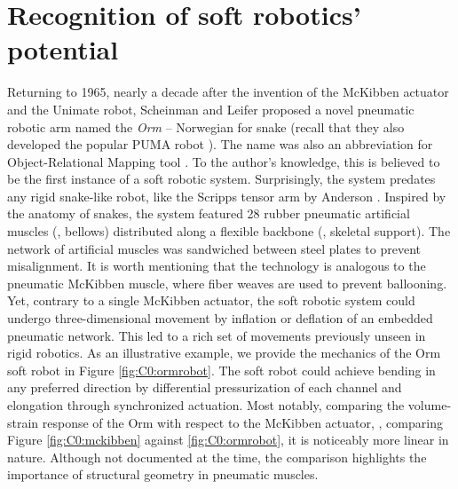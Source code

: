 \section{Recognition of soft robotics' potential} Returning to 1965, nearly a decade after the invention of the McKibben actuator and the Unimate robot, Scheinman and Leifer proposed a novel pneumatic robotic arm named the \emph{Orm} -- Norwegian for snake (recall that they also developed the popular PUMA robot \cite{BibEntryPuma2022Sep}). The name was also an abbreviation for Object-Relational Mapping tool \cite{Corke2020}. To the author's knowledge, this is believed to be the first instance of a soft robotic system. Surprisingly, the system predates any rigid snake-like robot, like the Scripps tensor arm by Anderson \cite{Anderson1968}. Inspired by the anatomy of snakes, the system featured 28 rubber pneumatic artificial muscles (\ie, bellows) distributed along a flexible backbone (\ie, skeletal support). The network of artificial muscles was sandwiched between steel plates to prevent misalignment. It is worth mentioning that the technology is analogous to the pneumatic McKibben muscle, where fiber weaves are used to prevent ballooning. Yet, contrary to a single McKibben actuator, the soft robotic system could undergo three-dimensional movement by inflation or deflation of an embedded pneumatic network. This led to a rich set of movements previously unseen in rigid robotics. As an illustrative example, we provide the mechanics of the Orm soft robot in Figure \ref{fig:C0:ormrobot}. The soft robot could achieve bending in any preferred direction by differential pressurization of each channel and elongation through synchronized actuation. Most notably, comparing the volume-strain response of the Orm with respect to the McKibben actuator, \ie, comparing Figure \ref{fig:C0:mckibben} against \ref{fig:C0:ormrobot}, it is noticeably more linear in nature. Although not documented at the time, the comparison highlights the importance of structural geometry in pneumatic muscles.

